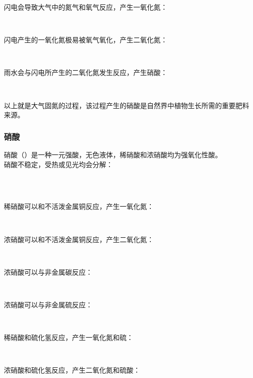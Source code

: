 \documentclass[UTF8]{ctexart}
\begin{document}
    闪电会导致大气中的氮气和氧气反应，产生一氧化氮：
    \begin{center}
        \\[4mm]
    \end{center}
    闪电产生的一氧化氮极易被氧气氧化，产生二氧化氮：
    \begin{center}
        \\[4mm]
    \end{center}
    雨水会与闪电所产生的二氧化氮发生反应，产生硝酸：
    \begin{center}
        \\[4mm]
    \end{center}
    以上就是大气固氮的过程，该过程产生的硝酸是自然界中植物生长所需的重要肥料来源。\\

\subsubsection{硝酸}
    硝酸（）是一种一元强酸，无色液体，稀硝酸和浓硝酸均为强氧化性酸。\\[3mm]
    硝酸不稳定，受热或见光均会分解：
    \begin{center}
        \\[3mm]
        \\[4mm]
    \end{center}
    稀硝酸可以和不活泼金属铜反应，产生一氧化氮：
    \begin{center}
        \\[4mm]
    \end{center}
    浓硝酸可以和不活泼金属铜反应，产生二氧化氮：
    \begin{center}
        \\[4mm]
    \end{center}
    浓硝酸可以与非金属碳反应：
    \begin{center}
        \\[4mm]
    \end{center}
    浓硝酸可以与非金属硫反应：
    \begin{center}
        \\[6mm]
    \end{center}
    稀硝酸和硫化氢反应，产生一氧化氮和硫：
    \begin{center}
        \\[4mm]
    \end{center}
    浓硝酸和硫化氢反应，产生二氧化氮和硫酸：
    \begin{center}
    \end{center}
\end{document}
